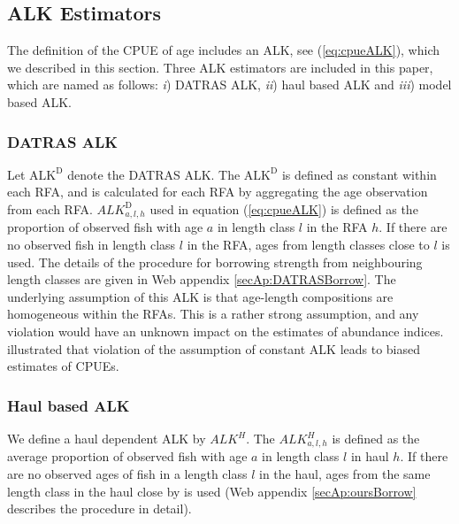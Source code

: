 \documentclass[a4paper 12pt]{article}
\numberwithin{equation}{section}
\begin{document}
 

\subsection{ALK Estimators}

The definition of the CPUE of age includes an ALK, see (\ref{eq:cpueALK}), which we described in this section. Three ALK estimators are included in this paper, which are named as follows:  \textit{i}) DATRAS ALK, \textit{ii}) haul based ALK and \textit{iii}) model based ALK.
\subsubsection{DATRAS ALK}
\label{sec:datrasalkestimator}
Let $\text{ALK}^{\text{D}}$ denote the DATRAS ALK. The $\text{ALK}^{\text{D}}$ is defined as constant within each RFA, and is calculated for each RFA by aggregating the age observation from each RFA. $ALK^{\text{D}}_{a,l,h}$ used in equation (\ref{eq:cpueALK}) is defined as the proportion of observed fish with age $a$ in length class $l$ in the RFA $h$. If there are no observed fish in length class $l$ in the RFA, ages from length classes close to $l$ is used. The details of the procedure for borrowing strength from neighbouring length classes are given in Web appendix \ref{secAp:DATRASBorrow}. The underlying assumption of this ALK  is that age-length compositions are homogeneous within the RFAs. This is a rather strong assumption, and any violation would have an unknown impact on the estimates of abundance indices. \citet{aanes2015efficient} illustrated that violation of the assumption of constant ALK leads to biased estimates of CPUEs. 

\subsubsection{Haul based ALK}
\label{sec:haulestimator}
We define a haul dependent ALK  by  $ALK^{H}$. The $ALK^{H}_{a,l,h}$ is defined as the average proportion of observed fish with age $a$ in  length class $l$ in haul $h$. If there are no observed ages of fish in a length class $l$ in the haul, ages from the same length class in the haul close by is used (Web appendix \ref{secAp:oursBorrow} describes the procedure in detail).
\end{document}
